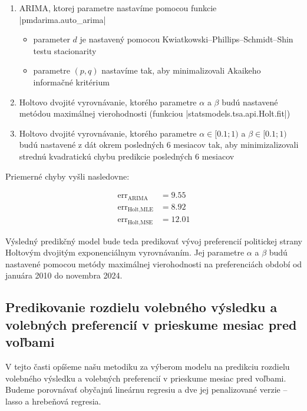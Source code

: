 \documentclass[main.tex]{subfiles}
\begin{document}
\begin{enumerate}
	\item ARIMA, ktorej parametre nastavíme pomocou funkcie \pyth|pmdarima.auto_arima|
	\begin{itemize}
		\item parameter $d$ je nastavený pomocou Kwiatkowski–Phillips–Schmidt–Shin testu stacionarity\\ 
		\item parametre $(p,q)$ nastavíme tak, aby minimalizovali Akaikeho informačné kritérium
	\end{itemize}
	\item Holtovo dvojité vyrovnávanie, ktorého parametre $\alpha$ a $\beta$ budú nastavené metódou maximálnej vierohodnosti (funkciou \pyth|statsmodels.tsa.api.Holt.fit|)
	\item Holtovo dvojité vyrovnávanie, ktorého parametre $\alpha \in [0.1;1) $ a $\beta \in [0.1;1)$ budú nastavené z dát okrem posledných 6 mesiacov tak, aby minimizalizovali strednú kvadratickú chybu predikcie posledných 6 mesiacov
\end{enumerate}

Priemerné chyby vyšli nasledovne:

\begin{align*}
	\operatorname{err}_{\operatorname{ARIMA}} &= 9.55 \\
	\operatorname{err}_{\operatorname{Holt, MLE}} &= 8.92 \\
	\operatorname{err}_{\operatorname{Holt, MSE}} &= 12.01
\end{align*}

Výsledný predikčný model bude teda predikovať vývoj preferencií politickej strany Holtovým dvojitým exponenciálnym vyrovnávaním. Jej parametre $\alpha$ a $\beta$ budú nastavené pomocou metódy maximálnej vierohodnosti na preferenciách období od januára 2010 do novembra 2024.


\subsection{Predikovanie rozdielu volebného výsledku a volebných preferencií v prieskume mesiac pred voľbami}

V tejto časti opíšeme našu metodiku za výberom modelu na predikciu rozdielu volebného výsledku a volebných preferencií v prieskume mesiac pred voľbami. Budeme porovnávať obyčajnú lineárnu regresiu a dve jej penalizované verzie -- lasso a hrebeňová regresia.
\end{document}
